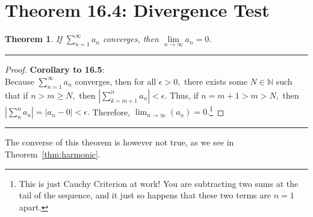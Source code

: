 \documentclass[openany, amssymb, psamsfonts]{amsart}
\newcommand{\bbN}{\mathbb{N}}
\newtheorem{thm}{Theorem}[section]
\theoremstyle{definition}
\numberwithin{equation}{section}
\begin{document}
\section*{Theorem 16.4: Divergence Test}
\begin{thm}
\label{16.4}
	If $\displaystyle\sum\limits_{n = 1}^{\infty} a_n$ converges, then $\lim\limits_{n\to\infty} a_n = 0$.
\end{thm}
\vspace{4pt}     \hrule   \vspace{4pt}\begin{proof}\textbf{Corollary to 16.5}:\\
Because $\displaystyle\sum_{n=1}^\infty a_n$ converges, then for all $\epsilon>0,$ there exists some $N \in \bbN$ such that if $n>m\geq N,$ then $|\displaystyle\sum_{k=m+1}^na_n|<\epsilon.$ Thus, if $n = m+1>m>N,$ then $|\displaystyle\sum_{n}^na_n| = |a_n - 0| <\epsilon.$ Therefore, $\displaystyle\lim_{n\to \infty}(a_n) = 0.$\footnote{This is just Cauchy Criterion at work! You are subtracting two sums at the tail of the sequence, and it just so happens that these two terms are $n=1$ apart.}
\end{proof}\vspace{4pt}     \hrule   \vspace{4pt}

The converse of this theorem is however not true, as we see in Theorem~\ref{thm:harmonic}. 
\end{document}

